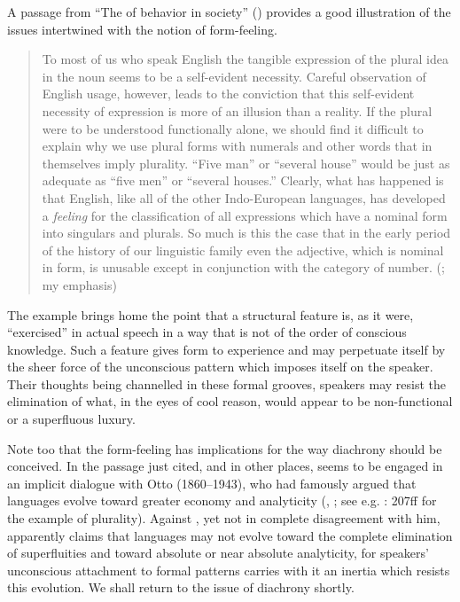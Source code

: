 \documentclass[output=paper]{langscibook}
\begin{document}
A passage from ``The  of behavior in society'' (\citeyear{Sapir1927b}) provides a good illustration of the issues intertwined with the notion of form-feeling.

\begin{quotation}
To most of us who speak English the tangible expression of the plural idea in the noun seems to be a self-evident necessity. Careful observation of English usage, however, leads to the conviction that this self-evident necessity of expression is more of an illusion than a reality. If the plural were to be understood functionally alone, we should find it difficult to explain why we use plural forms with numerals and other words that in themselves imply plurality. ``Five man'' or ``several house'' would be just as adequate as ``five men'' or ``several houses.'' Clearly, what has happened is that English, like all of the other Indo-European languages, has developed a \emph{feeling} for the classification of all expressions which have a nominal form into singulars and plurals. So much is this the case that in the early period of the history of our linguistic family even the adjective, which is nominal in form, is unusable except in conjunction with the category of number. (\citealt[550]{Sapir1927b}; my emphasis)
\end{quotation}

The example brings home the point that a structural feature is, as it were, ``exercised'' in actual speech in a way that is not of the order of conscious knowledge. Such a feature gives form to experience and may perpetuate itself by the sheer force of the unconscious pattern which imposes itself on the speaker. Their thoughts being channelled in these formal grooves, speakers may resist the elimination of what, in the eyes of cool reason, would appear to be non-functional or a superfluous luxury.

Note too that the form-feeling has implications for the way diachrony should be conceived. In the passage just cited, and in other places, {\Sapir} seems to be engaged in an implicit dialogue with Otto {\Jespersen} (1860--1943), who had famously argued that languages evolve toward greater economy and analyticity (\citeyear{Jespersen1894}, \citeyear{Jespersen1965}; see e.g. \citeyear{Jespersen1965}: 207ff for the example of plurality). Against {\Jespersen}, yet not in complete disagreement with him, {\Sapir} apparently claims that languages may not evolve toward the complete elimination of superfluities and toward absolute or near absolute analyticity, for speakers' unconscious attachment to formal patterns carries with it an inertia which resists this evolution. We shall return to the issue of diachrony shortly.
\end{document}
